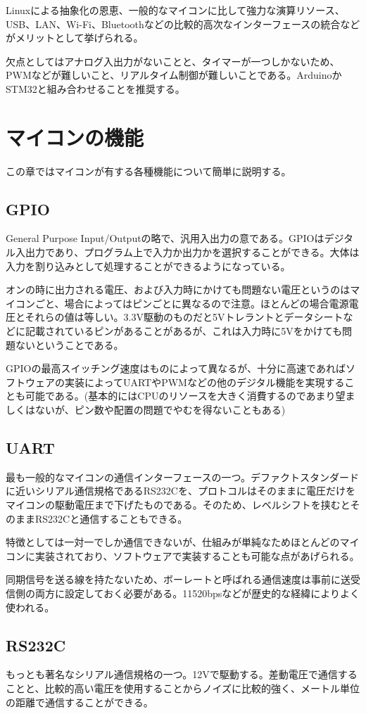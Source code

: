 \documentclass[a4paper,titlepage,here]{ujarticle}
\begin{document}
Linuxによる抽象化の恩恵、一般的なマイコンに比して強力な演算リソース、USB、LAN、Wi-Fi、Bluetoothなどの比較的高次なインターフェースの統合などがメリットとして挙げられる。

欠点としてはアナログ入出力がないことと、タイマーが一つしかないため、PWMなどが難しいこと、リアルタイム制御が難しいことである。ArduinoかSTM32と組み合わせることを推奨する。
\section{マイコンの機能}
この章ではマイコンが有する各種機能について簡単に説明する。
\subsection{GPIO}
General Purpose Input/Outputの略で、汎用入出力の意である。GPIOはデジタル入出力であり、プログラム上で入力か出力かを選択することができる。大体は入力を割り込みとして処理することができるようになっている。

オンの時に出力される電圧、および入力時にかけても問題ない電圧というのはマイコンごと、場合によってはピンごとに異なるので注意。ほとんどの場合電源電圧とそれらの値は等しい。3.3V駆動のものだと5Vトレラントとデータシートなどに記載されているピンがあることがあるが、これは入力時に5Vをかけても問題ないということである。

GPIOの最高スイッチング速度はものによって異なるが、十分に高速であればソフトウェアの実装によってUARTやPWMなどの他のデジタル機能を実現することも可能である。(基本的にはCPUのリソースを大きく消費するのであまり望ましくはないが、ピン数や配置の問題でやむを得ないこともある)
\subsection{UART}
最も一般的なマイコンの通信インターフェースの一つ。デファクトスタンダードに近いシリアル通信規格であるRS232Cを、プロトコルはそのままに電圧だけをマイコンの駆動電圧まで下げたものである。そのため、レベルシフトを挟むとそのままRS232Cと通信することもできる。

特徴としては一対一でしか通信できないが、仕組みが単純なためほとんどのマイコンに実装されており、ソフトウェアで実装することも可能な点があげられる。

同期信号を送る線を持たないため、ボーレートと呼ばれる通信速度は事前に送受信側の両方に設定しておく必要がある。11520bpsなどが歴史的な経緯によりよく使われる。
\subsection{RS232C}
もっとも著名なシリアル通信規格の一つ。12Vで駆動する。差動電圧で通信することと、比較的高い電圧を使用することからノイズに比較的強く、メートル単位の距離で通信することができる。
\end{document}

